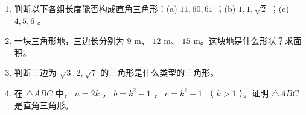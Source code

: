 \begin{practice}


\begin{enumerate}
  \item 判断以下各组长度能否构成直角三角形：(a) $11, 60, 61$ ；(b) $1, 1, \sqrt{2}$ ；(c) $4, 5, 6$ 。
  \item 一块三角形地，三边长分别为 $9$ m、 $12$ m、 $15$ m。这块地是什么形状？求面积。
  \item 判断三边为 $\sqrt{3}, 2, \sqrt{7}$ 的三角形是什么类型的三角形。
  \item 在 $\triangle ABC$ 中， $a = 2k$ ， $b = k^2 - 1$ ， $c = k^2 + 1$ （ $k > 1$ ）。证明 $\triangle ABC$ 是直角三角形。
\end{enumerate}


\end{practice}



